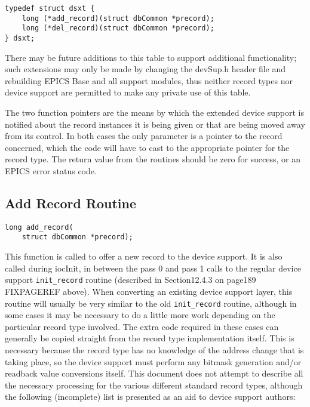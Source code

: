 \begin{verbatim}
typedef struct dsxt {
    long (*add_record)(struct dbCommon *precord);
    long (*del_record)(struct dbCommon *precord);
} dsxt;
\end{verbatim}

There may be future additions to this table to support additional functionality; such extensions may only be made by 
changing the devSup.h header file and rebuilding EPICS Base and all support modules, thus neither record types nor 
device support are permitted to make any private use of this table.

The two function pointers are the means by which the extended device support is notified about the record instances it is 
being given or that are being moved away from its control. In both cases the only parameter is a pointer to the record 
concerned, which the code will have to cast to the appropriate pointer for the record type. The return value from the 
routines should be zero for success, or an EPICS error status code.

\subsection{Add Record Routine}

\begin{verbatim}
long add_record(
    struct dbCommon *precord);
\end{verbatim}

This function is called to offer a new record to the device support. It is also called during iocInit, in between the pass 0 and 
pass 1 calls to the regular device support \verb|init_record| routine (described in Section12.4.3 on page189 FIXPAGEREF above). When 
converting an existing device support layer, this routine will usually be very similar to the old \verb|init_record| routine, 
although in some cases it may be necessary to do a little more work depending on the particular record type involved. The 
extra code required in these cases can generally be copied straight from the record type implementation itself. This is 
necessary because the record type has no knowledge of the address change that is taking place, so the device support must 
perform any bitmask generation and/or readback value conversions itself. This document does not attempt to describe all 
the necessary processing for the various different standard record types, although the following (incomplete) list is 
presented as an aid to device support authors:

